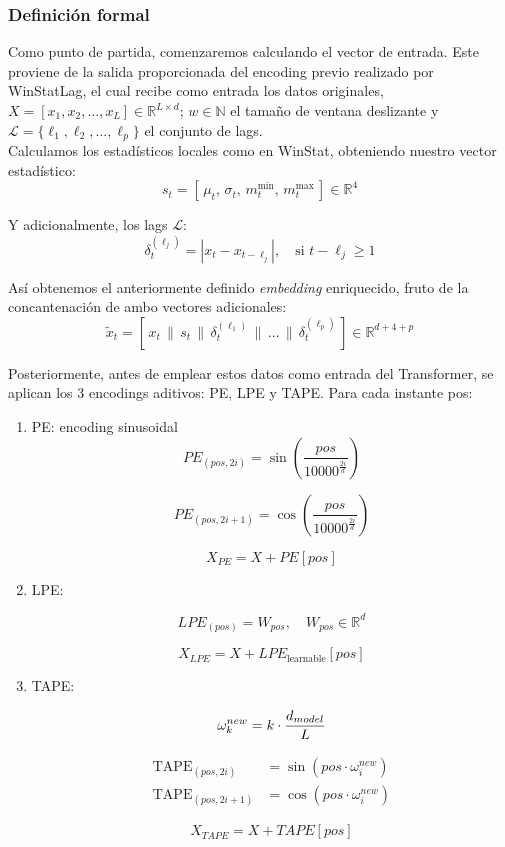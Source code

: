 \subsubsection{Definición formal}

Como punto de partida, comenzaremos calculando el vector de entrada. Este proviene de la salida proporcionada del encoding previo realizado por WinStatLag, el cual recibe como entrada los datos originales, $X = [x_1, x_2, \dots, x_L] \in \mathbb{R}^{L \times d}$; $w \in \mathbb{N}$ el tamaño de ventana deslizante y $\mathcal{L} = \{\ell_1, \ell_2, \dots, \ell_p\}$ el conjunto de lags.\\


Calculamos los estadísticos locales como en WinStat, obteniendo nuestro vector estadístico:
\[
s_t = [\,\mu_t,\, \sigma_t,\, m^{\min}_t,\, m^{\max}_t\,] \in \mathbb{R}^4
\]

Y adicionalmente, los lags $\mathcal{L}$:
\[
\delta_t^{(\ell_j)} = | x_t - x_{t - \ell_j}|, \quad \text{si } t - \ell_j \geq 1
\]

Así obtenemos el anteriormente definido \textit{embedding} enriquecido, fruto de la concantenación de ambo vectores adicionales:
\[
\tilde{x}_t = [\,x_t \,\|\, s_t \,\|\, \delta_t^{(\ell_1)} \,\|\, \dots \,\|\, \delta_t^{(\ell_p)}\,] \in \mathbb{R}^{d + 4 + p}
\]

Posteriormente, antes de emplear estos datos como entrada del Transformer, se aplican los 3 encodings aditivos: PE, LPE y TAPE. Para cada instante pos:

\begin{enumerate}
\item PE: encoding sinusoidal
$$
PE_{(pos, 2i)} = \sin\left(\frac{pos}{10000^{\frac{2i}{d}}}\right)
$$

$$
PE_{(pos, 2i+1)} = \cos\left(\frac{pos}{10000^{\frac{2i}{d}}}\right)
$$

$$
X_{PE} = X + PE[pos]
$$
\item LPE:

$$
LPE_{(pos)} = W_{pos}, \quad W_{pos} \in \mathbb{R}^d
$$

$$
X_{LPE} = X + LPE_{\text{learnable}}[pos]
$$

\item TAPE:

\begin{equation}
	\centering
	\omega^{new}_k = k \cdot \frac{d_{model}}{L}
\end{equation}


\begin{equation}
	\begin{aligned}
		\text{TAPE}_{(pos,2i)} &= \sin\!\left( pos \cdot \omega^{new}_i \right) \\
		\text{TAPE}_{(pos,2i+1)} &= \cos\!\left( pos \cdot \omega^{new}_i \right)
	\end{aligned}
\end{equation}

$$
X_{TAPE} = X + TAPE[pos]
$$

\end{enumerate}

